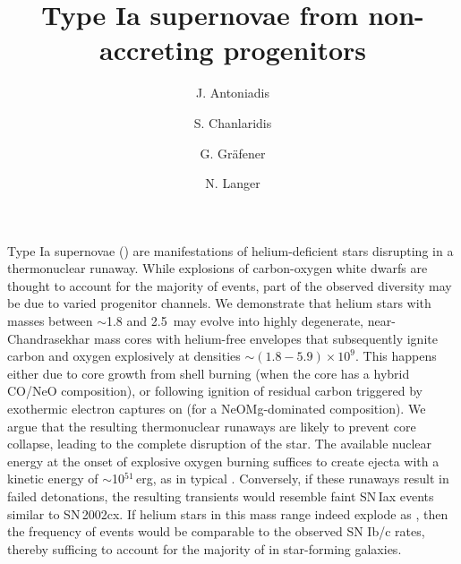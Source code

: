 \documentclass[twocolumn]{aa}
\begin{document}
\title{Type Ia supernovae from non-accreting progenitors}
 


   \author{J. Antoniadis 
   \and S. Chanlaridis 
   \and G. Gr\"{a}fener
   \and N. Langer
          }







\abstract 
{Type Ia supernovae (\ias) are  manifestations of helium-deficient stars disrupting in a 
thermonuclear runaway. While explosions of carbon-oxygen white dwarfs are 
thought to account for the majority of events, part of the observed diversity 
may be due to varied progenitor channels. We demonstrate that 
helium stars with masses between $\sim$1.8 and 2.5\msun\ may evolve 
into highly degenerate, near-Chandrasekhar mass cores with 
helium-free envelopes that subsequently  ignite carbon and oxygen explosively at densities $\sim(1.8-5.9)\times 10^{9}$\denu. This happens either due to core growth from 
shell burning (when the core has a hybrid CO/NeO composition), 
or following ignition of residual carbon triggered by  
exothermic electron captures on  (for a 
NeOMg-dominated  composition).
 We argue that the resulting 
thermonuclear runaways are likely to prevent core collapse, leading to the complete disruption of the star.
 The available nuclear energy at the onset of 
 explosive oxygen burning suffices to create 
 ejecta with a kinetic energy of $\sim$10$^{51}$\,erg, as in typical \ias. 
 Conversely, if these  runaways  result in failed detonations, the resulting transients would resemble faint 
 SN\,Iax events similar to SN\,2002cx. 
If helium stars in this mass range indeed explode as \ias, then the frequency of events would be comparable to the observed SN Ib/c rates, thereby sufficing to account for the majority of \ias in star-forming galaxies.}



\maketitle
\end{document}
